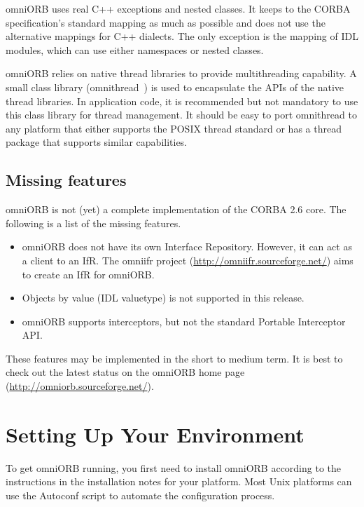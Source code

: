 \documentclass[11pt,twoside,a4paper]{book}
\newcommand{\weburl}{\url}
\newcommand{\file}{\begingroup \urlstyle{tt}\Url}
\begin{document}
omniORB uses real C++ exceptions and nested classes. It keeps to the
CORBA specification's standard mapping as much as possible and does
not use the alternative mappings for C++ dialects. The only exception
is the mapping of IDL modules, which can use either namespaces or
nested classes.

omniORB relies on native thread libraries to provide multithreading
capability. A small class library (omnithread~\cite{tjr96a}) is used
to encapsulate the APIs of the native thread libraries. In application
code, it is recommended but not mandatory to use this class library
for thread management. It should be easy to port omnithread to any
platform that either supports the POSIX thread standard or has a
thread package that supports similar capabilities.

\subsection{Missing features}
\label{sec:missing}

omniORB is not (yet) a complete implementation of the CORBA 2.6 core.
The following is a list of the missing features.

\begin{itemize}

\item omniORB does not have its own Interface Repository. However, it
can act as a client to an IfR. The omniifr project
(\weburl{http://omniifr.sourceforge.net/}) aims to create an IfR for
omniORB.

\item Objects by value (IDL valuetype) is not supported in this
release.

\item omniORB supports interceptors, but not the standard Portable
Interceptor API.

\end{itemize}

These features may be implemented in the short to medium term. It is
best to check out the latest status on the omniORB home page
(\weburl{http://omniorb.sourceforge.net/}).


\section{Setting Up Your Environment}
\label{sec:setup}

To get omniORB running, you first need to install omniORB according to
the instructions in the installation notes for your platform. Most
Unix platforms can use the Autoconf \file{configure} script to
automate the configuration process.
\end{document}
